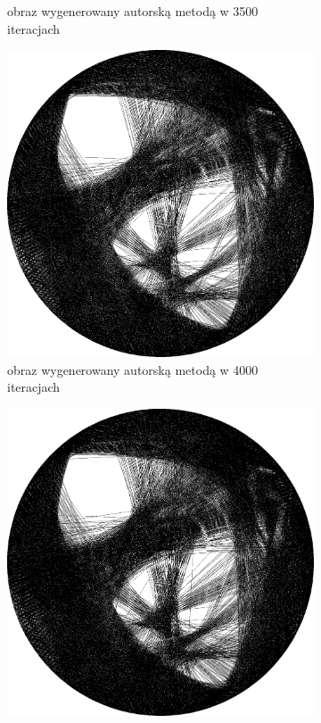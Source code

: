 \documentclass[a4paper, 12pt, polish, twoside]{extreport}
\begin{document}
\begin{figure}[H]
\begin{subfigure}{0.24\textwidth}
        \caption{obraz wygenerowany autorską metodą w 3500 iteracjach}
        \label{comp-comp-magdalene-m}
    \end{subfigure}
    \begin{subfigure}{0.24\textwidth}
        \centering
        \includegraphics[width = \textwidth]{img/6-comp/magdalene_e_i4000_c20_inv0_bg10_obj1_ed1.png}
        \caption{obraz wygenerowany autorską metodą w 4000 iteracjach}
        \label{comp-comp-magdalene-n}
    \end{subfigure}
    \begin{subfigure}{0.24\textwidth}
        \centering
        \includegraphics[width = \textwidth]{img/6-comp/magdalene_e_i4500_c20_inv0_bg10_obj1_ed1.png}

\end{subfigure}
\end{figure}
\end{document}
